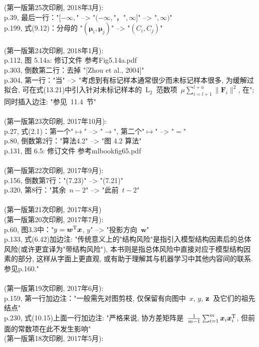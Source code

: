 \documentclass[UTF8]{article}
\begin{document}
(第一版第25次印刷, 2018年3月):
\\
p.39, 最后一行："$[-\infty,$" --> "$(-\infty,$"，"$, \infty]$" --> "$, \infty)$" \\
p.199, 式(9.12)：分母的 "$(\bm{\mu}_i, \bm{\mu}_j)$" --> "$(C_i, C_j)$" \\
\\
(第一版第24次印刷, 2018年1月):
\\
p.112, 图 5.14a: 修订文件 参考Fig5.14a.pdf \\
p.303, 倒数第二行：去掉 "[Zhou et al., 2004]" \\
p.304, 第一行："当" --> "考虑到有标记样本通常很少而未标记样本很多, 为缓解过拟合, 可在式(13.21)中引入针对未标记样本的~L$_2$~范数项~$\mu \sum_{i=l+1}^{l+u}\|\mathbf{F}_{i}\|^{2}$, 在"; 同时插入边注: "参见~11.4~节" \\
\\
(第一版第23次印刷, 2017年10月):
\\
p.27, 式(2.1)：第一个"$\mapsto$" --> "$\to$", 第二个"$\mapsto$" --> "$=$" \\
p.80, 倒数第2行："算法4.2" --> "图 4.2 算法" \\
p.131, 图 6.5: 修订文件 参考mlbookfig65.pdf\\
\\
(第一版第22次印刷, 2017年9月):
\\
p.156, 倒数第7行："(7.23)" --> "(7.21)" \\
p.320, 第8行："其余~$n-2$" --> "此前~$t-2$" \\
\\
(第一版第21次印刷, 2017年8月)
\\
(第一版第20次印刷, 2017年7月):
\\
p.60, 图3.3中："$y = \bm{w}^{\rm T}\bm{x}$, $y$" --> "投影方向~$\bm{w}$" \\
p.133, 式(6.42)加边注: "传统意义上的"结构风险"是指引入模型结构因素后的总体风险(或许更宜译为"带结构风险"), 本书则是指总体风险中直接对应于模型结构因素的部分, 这样从字面上更直观, 或有助于理解其与机器学习中其他内容间的联系. 参见p.160." \\
\\
(第一版第19次印刷, 2017年6月):
\\
p.159, 第一行加边注："一般需先对图剪枝, 仅保留有向图中~$x$, $y$, $\bf{z}$~及它们的祖先结点" \\
p.230, 式(10.15)上面一行加边注: "严格来说, 协方差矩阵是~${1 \over {m-1}}\sum\nolimits_{i=1}^m\bm{x}_i\bm{x}_i^{\rm T}$, 但前面的常数项在此不发生影响"
\\
(第一版第18次印刷, 2017年5月):
\end{document}
